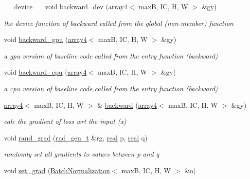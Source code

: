 \begin{DoxyCompactItemize}
\+\_\+\+\_\+device\+\_\+\+\_\+ void \hyperlink{structBatchNormalization_a3c96c56393798abdb00647aae73b197a}{backward\+\_\+dev} (\hyperlink{structarray4}{array4}$<$ maxB, IC, H, W $>$ \&gy)
\begin{DoxyCompactList}\small\item\em the device function of backward called from the global (non-\/member) function \end{DoxyCompactList}\item 
void \hyperlink{structBatchNormalization_a2a80a633ecc4a5ed378dd0ff70d275e1}{backward\+\_\+gpu} (\hyperlink{structarray4}{array4}$<$ maxB, IC, H, W $>$ \&gy)
\begin{DoxyCompactList}\small\item\em a gpu version of baseline code called from the entry function (backward) \end{DoxyCompactList}\item 
void \hyperlink{structBatchNormalization_af60d17f3a0af3a4fd8556a93eddcf7c9}{backward\+\_\+cpu} (\hyperlink{structarray4}{array4}$<$ maxB, IC, H, W $>$ \&gy)
\begin{DoxyCompactList}\small\item\em a cpu version of baseline code called from the entry function (backward) \end{DoxyCompactList}\item 
\hyperlink{structarray4}{array4}$<$ maxB, IC, H, W $>$ \& \hyperlink{structBatchNormalization_a3b6d987026effdc6c3a2c99e54ae58f9}{backward} (\hyperlink{structarray4}{array4}$<$ maxB, IC, H, W $>$ \&gy)
\begin{DoxyCompactList}\small\item\em calc the gradient of loss wrt the input (x) \end{DoxyCompactList}\item 
void \hyperlink{structBatchNormalization_acf65ad8948335d6a4ebff9ba2a0ab906}{rand\+\_\+grad} (\hyperlink{structrnd__gen__t}{rnd\+\_\+gen\+\_\+t} \&rg, \hyperlink{vgg__util_8h_a1082d08aaa761215ec83e7149f27ad16}{real} p, \hyperlink{vgg__util_8h_a1082d08aaa761215ec83e7149f27ad16}{real} q)
\begin{DoxyCompactList}\small\item\em randomly set all gradients to values between p and q \end{DoxyCompactList}\item 
void \hyperlink{structBatchNormalization_aeadf5127ff94fb3e53c30272e7346f0d}{set\+\_\+grad} (\hyperlink{structBatchNormalization}{Batch\+Normalization}$<$ maxB, IC, H, W $>$ \&o)

\end{DoxyCompactItemize}
